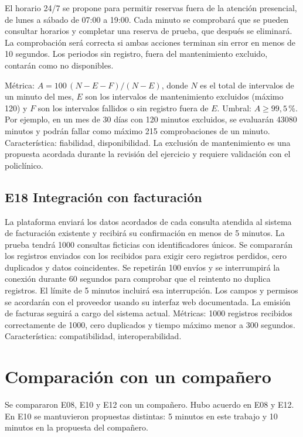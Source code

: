 \documentclass[11pt,a4paper]{article}
\begin{document}
El horario 24/7 se propone para permitir reservas fuera de la atención presencial, de lunes a sábado de 07:00 a 19:00. Cada minuto se comprobará que se pueden consultar horarios y completar una reserva de prueba, que después se eliminará. La comprobación será correcta si ambas acciones terminan sin error en menos de 10 segundos. Los periodos sin registro, fuera del mantenimiento excluido, contarán como no disponibles.

Métrica: $A=100\,(N-E-F)/(N-E)$, donde $N$ es el total de intervalos de un minuto del mes, $E$ son los intervalos de mantenimiento excluidos (máximo 120) y $F$ son los intervalos fallidos o sin registro fuera de $E$. Umbral: $A\geq99{,}5$\,\%. Por ejemplo, en un mes de 30 días con 120 minutos excluidos, se evaluarán 43080 minutos y podrán fallar como máximo 215 comprobaciones de un minuto. Característica: fiabilidad, disponibilidad. La exclusión de mantenimiento es una propuesta acordada durante la revisión del ejercicio y requiere validación con el policlínico.

\subsection{E18 Integración con facturación}
La plataforma enviará los datos acordados de cada consulta atendida al sistema de facturación existente y recibirá su confirmación en menos de 5 minutos. La prueba tendrá 1000 consultas ficticias con identificadores únicos. Se compararán los registros enviados con los recibidos para exigir cero registros perdidos, cero duplicados y datos coincidentes. Se repetirán 100 envíos y se interrumpirá la conexión durante 60 segundos para comprobar que el reintento no duplica registros. El límite de 5 minutos incluirá esa interrupción. Los campos y permisos se acordarán con el proveedor usando su interfaz web documentada. La emisión de facturas seguirá a cargo del sistema actual. Métricas: 1000 registros recibidos correctamente de 1000, cero duplicados y tiempo máximo menor a 300 segundos. Característica: compatibilidad, interoperabilidad.

\section{Comparación con un compañero}

Se compararon E08, E10 y E12 con un compañero. Hubo acuerdo en E08 y E12. En E10 se mantuvieron propuestas distintas: 5 minutos en este trabajo y 10 minutos en la propuesta del compañero.
\end{document}
